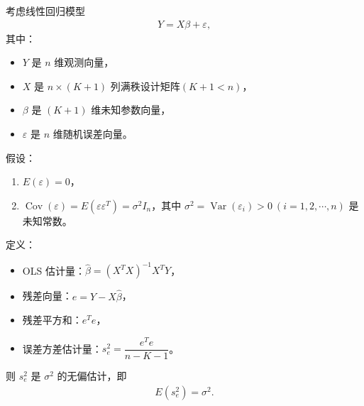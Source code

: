 \documentclass[../main.tex]{subfiles}
\begin{document}
\begin{theorem}\label{theorem:appE-OLS误差方差无偏估计}
考虑线性回归模型
\begin{align*}
Y = X\beta + \varepsilon,
\end{align*}
其中：
\begin{itemize}
\item $Y$ 是 $n$ 维观测向量，
\item $X$ 是 $n \times (K+1)$ 列满秩设计矩阵$(K+1<n)$，
\item $\beta$ 是 $(K+1)$ 维未知参数向量，
\item $\varepsilon$ 是 $n$ 维随机误差向量。
\end{itemize}

假设：
\begin{enumerate}[(1)]
\item $E(\varepsilon)=0$，
\item $\operatorname{Cov}(\varepsilon)=E(\varepsilon\varepsilon^T)=\sigma^2 I_n$，其中 $\sigma^2=\operatorname{Var}(\varepsilon_i)>0\ (i=1,2,\cdots,n)$ 是未知常数。
\end{enumerate}

定义：
\begin{itemize}
\item OLS 估计量：$\hat{\beta}=(X^TX)^{-1}X^TY$，
\item 残差向量：$e=Y-X\hat{\beta}$，
\item 残差平方和：$e^Te$，
\item 误差方差估计量：$s_e^2=\dfrac{e^Te}{n-K-1}$。
\end{itemize}

则 $s_e^2$ 是 $\sigma^2$ 的无偏估计，即
\begin{align*}
E(s_e^2)=\sigma^2.
\end{align*}
\end{theorem}
\end{document}
